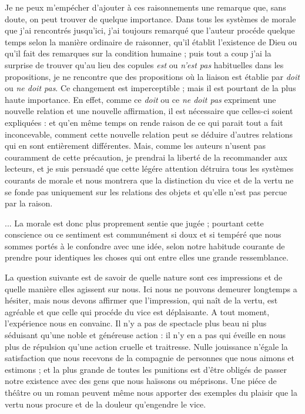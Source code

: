 Je ne peux m’empécher d’ajouter à ces raisonnements une
remarque que, sans doute, on peut trouver de quelque
importance. Dans tous les systèmes de morale que j’ai
rencontrés jusqu’ici, j’ai toujours remarqué que l’auteur
procéde quelque temps selon la manière ordinaire de
raisonner, qu’il établit l'existence de Dieu ou qu’il fait
des remarques sur la condition humaine ; puis tout a coup
j'ai la surprise de trouver qu’au lieu des copules {\it est} ou
{\it n'est pas} habituelles dans les propositions, je ne rencontre
que des propositions où la liaison est établie par {\it doit} ou
{\it ne doit pas}. Ce changement est imperceptible ; mais il est
pourtant de la plus haute importance. En effet, comme ce
{\it doit} ou ce {\it ne doit pas} expriment une nouvelle relation et
une nouvelle affirmation, il est nécessaire que celles-ci
soient expliquées : et qu’en même temps on rende raison
de ce qui parait tout a fait inconcevable, comment cette
nouvelle relation peut se déduire d’autres relations qui
en sont entièrement différentes. Mais, comme les auteurs
n’usent pas couramment de cette précaution, je prendrai
la liberté de la recommander aux lecteurs, et je suis persuadé
que cette légére attention détruira tous les systèmes
courants de morale et nous montrera que la distinction
du vice et de la vertu ne se fonde pas uniquement sur les
relations des objets et qu’elle n’est pas percue par la
raison.

... La morale est donc plus proprement sentie que jugée ;
pourtant cette conscience ou ce sentiment est communément
si doux et si tempéré que nous sommes portés à le
confondre avec une idée, selon notre habitude courante
de prendre pour identiques les choses qui ont entre elles
une grande ressemblance.

La question suivante est de savoir de quelle nature sont
ces impressions et de quelle manière elles agissent sur
nous. Ici nous ne pouvons demeurer longtemps a hésiter,
mais nous devons affirmer que l'impression, qui naît de
la vertu, est agréable et que celle qui procéde du vice est
déplaisante. A tout moment, l'expérience nous en convainc.
Il n’y a pas de spectacle plus beau ni plus séduisant qu’une
noble et généreuse action : il n’y en a pas qui éveille en
nous plus de répulsion qu’une action cruelle et traitresse.
Nulle jouissance n’égale la satisfaction que nous recevons
de la compagnie de personnes que nous aimons et estimons ;
et la plus grande de toutes les punitions est d’être
obligés de passer notre existence avec des gens que nous
haïssons ou méprisons. Une piéce de théâtre ou un roman
peuvent même nous apporter des exemples du plaisir
que la vertu nous procure et de la douleur qu’engendre le
vice.

